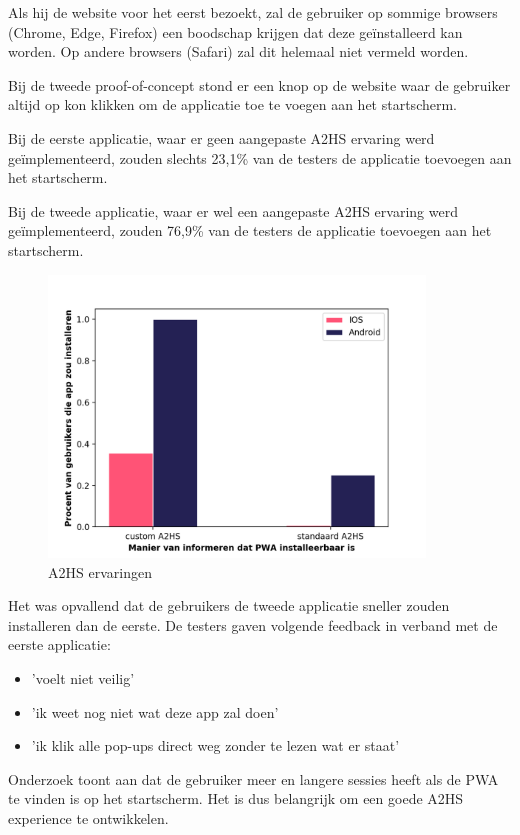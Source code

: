 		Als hij de website voor het eerst bezoekt, zal de gebruiker op sommige browsers (Chrome, Edge, Firefox) een boodschap krijgen dat deze geïnstalleerd kan worden.  Op andere browsers (Safari) zal dit helemaal niet vermeld worden.
				
		Bij de tweede proof-of-concept stond er een knop op de website waar de gebruiker altijd op kon klikken om de applicatie toe te voegen aan het startscherm. 
		
		Bij de eerste applicatie, waar er geen aangepaste A2HS ervaring werd geïmplementeerd, zouden slechts 23,1\% van de testers de applicatie toevoegen aan het startscherm.  
		
		Bij de tweede applicatie, waar er wel een aangepaste A2HS ervaring werd geïmplementeerd, zouden 76,9\% van de testers de applicatie toevoegen aan het startscherm.
		
		\begin{figure}[H]
			\centering
			\includegraphics[width=100mm]{./img/A2HS_data.png}
			\caption{A2HS ervaringen}
		\end{figure}

		Het was opvallend dat de gebruikers de tweede applicatie sneller zouden installeren dan de eerste. De testers gaven volgende feedback in verband met de eerste applicatie:
		\begin{itemize}
	  		\item 'voelt niet veilig'
			\item 'ik weet nog niet wat deze app zal doen'
			\item 'ik klik alle pop-ups direct weg zonder te lezen wat er staat'
	  	\end{itemize}	

		Onderzoek \autocite{LePage2020b} toont aan dat de gebruiker meer en langere sessies heeft als de PWA te vinden is op het startscherm. Het is dus belangrijk om een goede A2HS experience te ontwikkelen.
		

